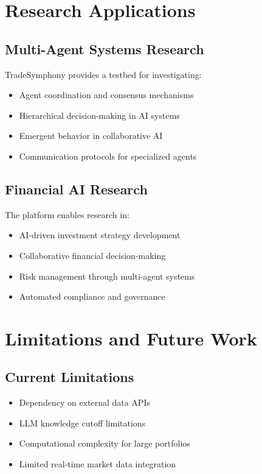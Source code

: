 \documentclass[11pt,a4paper]{article}
\begin{document}
\section{Research Applications}

\subsection{Multi-Agent Systems Research}
TradeSymphony provides a testbed for investigating:
\begin{itemize}
    \item Agent coordination and consensus mechanisms
    \item Hierarchical decision-making in AI systems
    \item Emergent behavior in collaborative AI
    \item Communication protocols for specialized agents
\end{itemize}

\subsection{Financial AI Research}
The platform enables research in:
\begin{itemize}
    \item AI-driven investment strategy development
    \item Collaborative financial decision-making
    \item Risk management through multi-agent systems
    \item Automated compliance and governance
\end{itemize}

\section{Limitations and Future Work}

\subsection{Current Limitations}
\begin{itemize}
    \item Dependency on external data APIs
    \item LLM knowledge cutoff limitations
    \item Computational complexity for large portfolios
    \item Limited real-time market data integration
\end{itemize}
\end{document}
